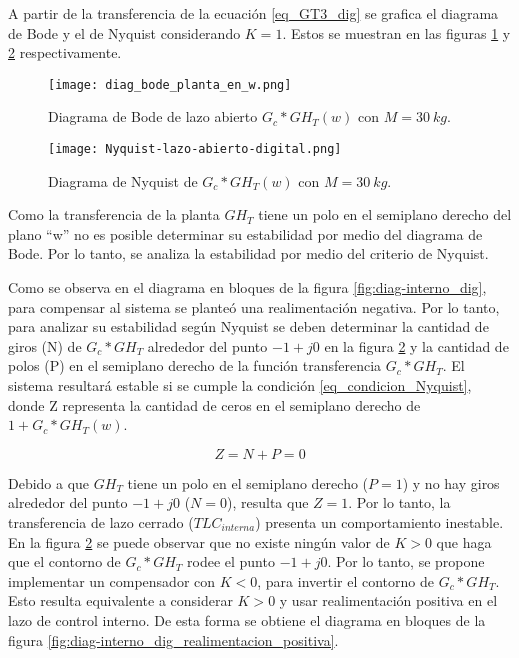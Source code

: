  A partir de la transferencia de la ecuación  \ref{eq_GT3_dig} se  grafica el diagrama de Bode y el de Nyquist considerando $K=1$. Estos se muestran en las figuras \ref{fig:bode_digital} y \ref{fig:nyquist-lazo-abierto-digital} respectivamente.

\begin{figure}[H]
	\centering
	\texttt{[image: diag\_bode\_planta\_en\_w.png]}
	\caption{Diagrama de Bode de lazo abierto $G_c*GH_{T}(w)$ con $M=30\:kg$.}
	\label{fig:bode_digital}
\end{figure}

\begin{figure}[H]
	\centering
	\texttt{[image: Nyquist-lazo-abierto-digital.png]}
	\caption{Diagrama de Nyquist de $G_c*GH_{T}(w)$ con $M=30\:kg$.}
	\label{fig:nyquist-lazo-abierto-digital}
\end{figure}

Como la transferencia de la planta $GH_T$ tiene un polo en el semiplano derecho del plano ``w'' no es posible determinar su estabilidad por medio del diagrama de Bode. Por lo tanto, se analiza la estabilidad por medio del criterio de Nyquist.

Como se observa en el diagrama en bloques de la figura \ref{fig:diag-interno_dig}, para compensar al sistema se planteó una realimentación negativa. Por lo tanto, para analizar su estabilidad según Nyquist se deben determinar la cantidad de giros (N) de $G_c*GH_T$ alrededor del punto $-1+j0$ en la figura \ref{fig:nyquist-lazo-abierto-digital} y la cantidad de polos (P) en el semiplano derecho de la función transferencia $G_c*GH_T$. El sistema resultará estable si se cumple la condición \ref{eq_condicion_Nyquist}, donde Z representa la cantidad de ceros en el semiplano derecho de $1+G_c*GH_T(w)$.

\begin{equation}\label{eq_condicion_Nyquist}
	Z=N+P=0
\end{equation}


Debido a que $GH_T$ tiene un polo en el semiplano derecho ($P=1$) y no hay giros alrededor del punto $-1+j0$ ($N=0$), resulta que $Z=1$. Por lo tanto, la transferencia de lazo cerrado ($TLC_{interna}$) presenta un comportamiento inestable. En la figura \ref{fig:nyquist-lazo-abierto-digital} se puede observar que no existe ningún valor de $K>0$ que haga que el contorno de $G_c*GH_T$ rodee el punto $-1+j0$. Por lo tanto, se propone implementar un compensador con $K<0$, para invertir el contorno de $G_c*GH_T$. Esto resulta equivalente a considerar $K>0$ y usar realimentación positiva en el lazo de control interno. De esta forma se obtiene el diagrama en bloques de la figura \ref{fig:diag-interno_dig_realimentacion_positiva}.


